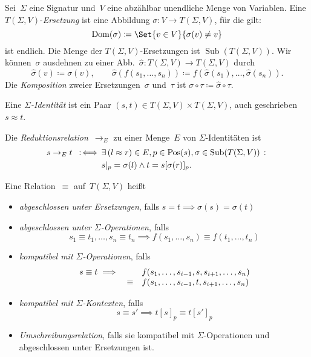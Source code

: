 \documentclass{cheat-sheet}
\DeclareMathOperator{\Pos}{Pos} %
\DeclareMathOperator{\Dom}{Dom} %
\DeclareMathOperator{\Subst}{Sub} %
\newcommand{\ident}{\approx} %
\begin{document}
\begin{defn}
  Sei~$\Sigma$ eine Signatur und~$V$ eine abzählbar unendliche Menge von Variablen.
  Eine $T(\Sigma, V)$-\emph{Ersetzung} ist eine Abbildung $\sigma : V \to T(\Sigma, V)$, für die gilt:
  \[
    \Dom(\sigma) \coloneqq \Set{v \in V}{\sigma(v) \neq v}
  \]
  ist endlich.
  Die Menge der $T(\Sigma, V)$-Ersetzungen ist $\Subst(T(\Sigma, V))$.
  Wir können~$\sigma$ ausdehnen zu einer Abb.~$\hat{\sigma} : T(\Sigma, V) \to T(\Sigma, V)$ durch
  \[
    \hat{\sigma}(v) \coloneqq \sigma(v), \qquad
    \hat{\sigma}(f(s_1, \ldots, s_n)) \coloneqq f(\hat{\sigma}(s_1), \ldots, \hat{\sigma}(s_n)).
  \]
  Die \textit{Komposition} zweier Ersetzungen~$\sigma$ und~$\tau$ ist $\sigma \circ \tau \coloneqq \hat{\sigma} \circ \tau$.
\end{defn}

\begin{defn}
  Eine \emph{$\Sigma$-Identität} ist ein Paar $(s, t) \in T(\Sigma, V) \times T(\Sigma, V)$, auch geschrieben $s \ident t$.
\end{defn}

\begin{defn}
  Die \emph{Reduktionsrelation}~$\to_E$ zu einer Menge~$E$ von $\Sigma$-Identitäten ist
  \begin{align*}
    s \to_E t \coloniff \, & \ex{(l \ident r) \in E, p \in \Pos(s), \sigma \in \Subst(T(\Sigma, V))} \\
    & s|_p = \sigma(l) \wedge t = s[\sigma(r)]_p.
  \end{align*}
\end{defn}

\begin{defn}
  Eine Relation~$\equiv$ auf~$T(\Sigma, V)$ heißt
  \begin{itemize}
    \item \emph{abgeschlossen unter Ersetzungen}, falls $s = t \implies \sigma(s) = \sigma(t)$
    \item \emph{abgeschlossen unter $\Sigma$-Operationen}, falls
    \[
      s_1 \equiv t_1, \ldots, s_n \equiv t_n \implies f(s_1, \ldots, s_n) \equiv f(t_1, \ldots, t_n)
    \]
    \item \emph{kompatibel mit $\Sigma$-Operationen}, falls
    \[
      \begin{array}{r c l}
        s \equiv t \implies &&
        f(s_1, \ldots, s_{i-1}, s, s_{i+1}, \ldots, s_n) \\
        &\equiv& f(s_1, \ldots, s_{i-1}, t, s_{i+1}, \ldots, s_n)
      \end{array}
    \]
    \item \emph{kompatibel mit $\Sigma$-Kontexten}, falls
    \[
      s \equiv s' \implies t[s]_p \equiv t[s']_p
    \]
    \item \emph{Umschreibungsrelation}, falls sie kompatibel mit $\Sigma$-Operationen und abgeschlossen unter Ersetzungen ist.
  \end{itemize}
\end{defn}
\end{document}
